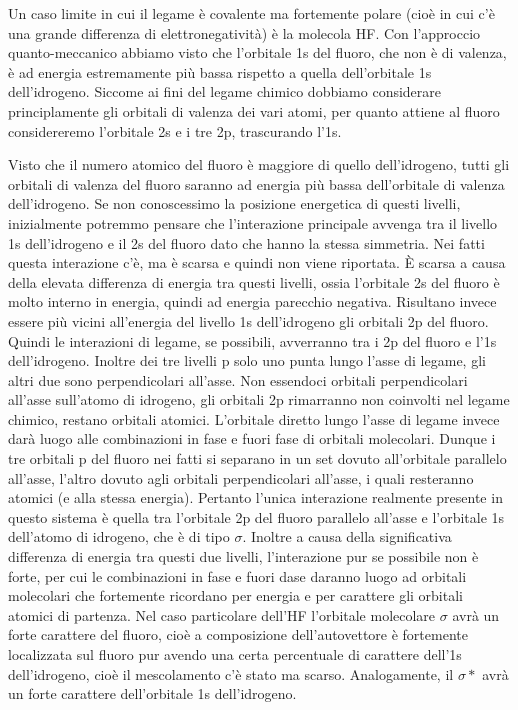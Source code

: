 Un caso limite in cui il legame è covalente ma fortemente polare (cioè in cui c'è una grande differenza di elettronegatività) è la molecola HF. Con l'approccio quanto-meccanico abbiamo visto che l'orbitale 1s del fluoro, che non è di valenza, è ad energia estremamente più bassa rispetto a quella dell'orbitale 1s dell'idrogeno. Siccome ai fini del legame chimico dobbiamo considerare principlamente gli orbitali di valenza dei vari atomi, per quanto attiene al fluoro considereremo l'orbitale 2s e i tre 2p, trascurando l'1s.

Visto che il numero atomico del fluoro è maggiore di quello dell'idrogeno, tutti gli orbitali di valenza del fluoro saranno ad energia più bassa dell'orbitale di valenza dell'idrogeno. Se non conoscessimo la posizione energetica di questi livelli, inizialmente potremmo pensare che l'interazione principale avvenga tra il livello 1s dell'idrogeno e il 2s del fluoro dato che hanno la stessa simmetria. Nei fatti questa interazione c'è, ma è scarsa e quindi non viene riportata. È scarsa a causa della elevata differenza di energia tra questi livelli, ossia l'orbitale 2s del fluoro è molto interno in energia, quindi ad energia parecchio negativa. Risultano invece essere più vicini all'energia del livello 1s dell'idrogeno gli orbitali 2p del fluoro. Quindi le interazioni di legame, se possibili, avverranno tra i 2p del fluoro e l'1s dell'idrogeno. Inoltre dei tre livelli p solo uno punta lungo l'asse di legame, gli altri due sono perpendicolari all'asse. Non essendoci orbitali perpendicolari all'asse sull'atomo di idrogeno, gli orbitali 2p rimarranno non coinvolti nel legame chimico, restano orbitali atomici. L'orbitale diretto lungo l'asse di legame invece darà luogo alle combinazioni in fase e fuori fase di orbitali molecolari. Dunque i tre orbitali p del fluoro nei fatti si separano in un set dovuto all'orbitale parallelo all'asse, l'altro dovuto agli orbitali perpendicolari all'asse, i quali resteranno atomici (e alla stessa energia). Pertanto l'unica interazione realmente presente in questo sistema è quella tra l'orbitale 2p del fluoro parallelo all'asse e l'orbitale 1s dell'atomo di idrogeno, che è di tipo $\sigma$. Inoltre a causa della significativa differenza di energia tra questi due livelli, l'interazione pur se possibile non è forte, per cui le combinazioni in fase e fuori dase daranno luogo ad orbitali molecolari che fortemente ricordano per energia e per carattere gli orbitali atomici di partenza. Nel caso particolare dell'HF l'orbitale molecolare $\sigma$ avrà un forte carattere del fluoro, cioè a composizione dell'autovettore è fortemente localizzata sul fluoro pur avendo una certa percentuale di carattere dell'1s dell'idrogeno, cioè il mescolamento c'è stato ma scarso. Analogamente, il $\sigma*$ avrà un forte carattere dell'orbitale 1s dell'idrogeno.

